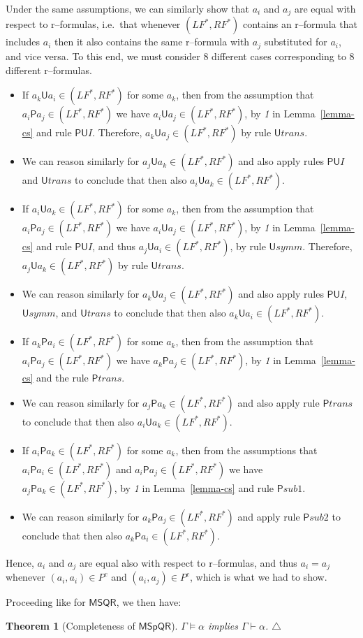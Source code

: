 \documentclass[times, 10pt]{article}
\newcommand{\MSQR}{\textsf{MSQR}}
\newcommand{\MSpQR}{\textsf{MSpQR}}
\newcommand{\Un}{\textsf{U}}
\newtheorem{theorem}{Theorem}
\newcommand{\Uns}{\Un \mathit{symm}}
\newcommand{\Unt}{\Un \mathit{trans}}
\renewcommand{\Un}{\mathsf{U}}
\newcommand{\PMe}{\mathsf{P}}
\newcommand{\PMetrans}{\PMe\mathit{trans}}
\newcommand{\PMesubone}{\PMe\mathit{sub1}}
\newcommand{\PMesubtwo}{\PMe\mathit{sub2}}
\newcommand{\LF}{\mathit{LF}}
\newcommand{\RF}{\mathit{RF}}
\begin{document}
\begin{itemize}
Under the same assumptions, we can similarly show that $a_i$ and $a_j$ are equal with 
respect to r--formulas, i.e.~that whenever $(\LF^*,\RF^*)$ contains an r--formula that includes $
a_i$ then it also contains the same r--formula with $a_j$ substituted for $a_i$, and vice versa. 
To this end, we must consider 8 different cases corresponding to 8 different r--formulas. 
\begin{itemize}
\item If $a_k \Un a_i \in (\LF^*,\RF^*)$ for some $a_k$, then from the assumption that 
$a_i \PMe a_j \in (\LF^*,\RF^*)$ we have $a_i \Un a_j \in (\LF^*,\RF^*)$, 
by \emph{1} in Lemma~\ref{lemma-cs} and rule $\PMe\Un I$. Therefore, 
$a_k \Un a_j \in (\LF^*,\RF^*)$ by rule $\Unt$.  
\item We can reason similarly for $a_j \Un a_k \in (\LF^*,\RF^*)$ and also apply rules $\PMe\Un I$ 
and $\Unt$ to conclude that then also $a_i \Un a_k \in (\LF^*,\RF^*)$. 
\item If $a_i \Un a_k \in (\LF^*,\RF^*)$ for some $a_k$, then from the assumption that 
$a_i \PMe a_j \in (\LF^*,\RF^*)$ we have $a_i \Un a_j \in (\LF^*,\RF^*)$, 
by \emph{1} in Lemma~\ref{lemma-cs} and rule $\PMe\Un I$, and thus 
$a_j \Un a_i \in (\LF^*,\RF^*)$, by rule $\Uns$. Therefore, 
$a_j \Un a_k \in (\LF^*,\RF^*)$ by rule $\Unt$.  
\item We can reason similarly for $a_k \Un a_j \in (\LF^*,\RF^*)$ and also apply rules $\PMe\Un I$,
$\Uns$, and $\Unt$ to conclude that then also $a_k \Un a_i \in (\LF^*,\RF^*)$. 
\item If $a_k \PMe a_i \in (\LF^*,\RF^*)$ for some $a_k$, then from the assumption that 
$a_i \PMe a_j \in (\LF^*,\RF^*)$ we have $a_k \PMe a_j \in (\LF^*,\RF^*)$,
by \emph{1} in Lemma~\ref{lemma-cs} and the rule $\PMetrans$.
\item We can reason similarly for $a_j \PMe a_k \in (\LF^*,\RF^*)$ and also apply rule $\PMetrans$
to conclude that then also $a_i \Un a_k \in (\LF^*,\RF^*)$. 
\item If $a_i \PMe a_k \in (\LF^*,\RF^*)$ for some $a_k$, then from the assumptions that 
$a_i \PMe a_i \in (\LF^*,\RF^*)$ and $a_i \PMe a_j \in (\LF^*,\RF^*)$ we have 
$a_j \PMe a_k \in (\LF^*,\RF^*)$, by \emph{1} in Lemma~\ref{lemma-cs} and rule $\PMesubone$.  
\item We can reason similarly for $a_k \PMe a_j \in (\LF^*,\RF^*)$ and apply rule $\PMesubtwo$
to conclude that then also $a_k \PMe a_i \in (\LF^*,\RF^*)$. 
\end{itemize}
Hence, $a_i$ and $a_j$ are equal also with respect to r--formulas, and thus
$a_i = a_j$ whenever $(a_i,a_i) \in P^c$ and $(a_i,a_j) \in P^c$, which is what we had to show.
\end{itemize}

Proceeding like for $\MSQR$, we then have:
\begin{theorem}[Completeness of $\MSpQR$]\label{theorem:completeness-MSpQR}
$\Gamma \vDash \alpha$ implies $\Gamma \vdash \alpha$. \hfill $\triangle$
\end{theorem}
\end{document}
